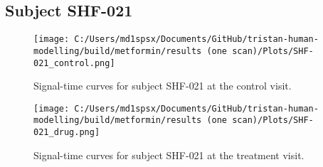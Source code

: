 \documentclass{epflreport}%
\begin{document}
\subsection{Subject SHF{-}021}%
\label{subsec:SubjectSHF{-}021}%

%


\begin{figure}[h!]%
\centering%
\texttt{[image: C:/Users/md1spsx/Documents/GitHub/tristan-human-modelling/build/metformin/results (one scan)/Plots/SHF-021\_control.png]}%
\caption{Signal{-}time curves for subject SHF{-}021 at the control visit.}%
\end{figure}

%


\begin{figure}[h!]%
\centering%
\texttt{[image: C:/Users/md1spsx/Documents/GitHub/tristan-human-modelling/build/metformin/results (one scan)/Plots/SHF-021\_drug.png]}%
\caption{Signal{-}time curves for subject SHF{-}021 at the treatment visit.}%
\end{figure}
\end{document}
